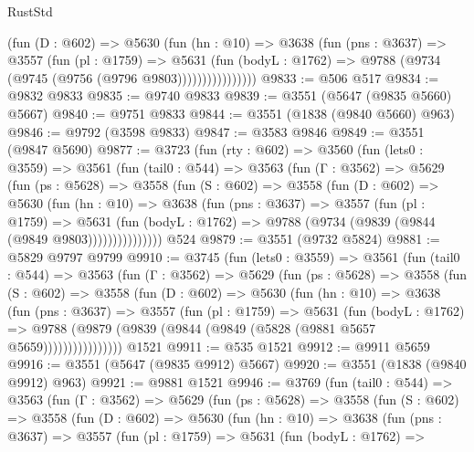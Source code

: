 \begin{lexlean}{RustStd}
\begin{coremodule}
                  (fun (D : @602) =>
                  @5630
                    (fun (hn : @10) =>
                    @3638
                      (fun (pns : @3637) =>
                      @3557
                        (fun (pl : @1759) =>
                        @5631
                          (fun (bodyL : @1762) =>
                          @9788 (@9734 (@9745 (@9756 (@9796 @9803))))))))))))))))
@9833 := @506 @517
@9834 := @9832 @9833
@9835 := @9740 @9833
@9839 := @3551 (@5647 (@9835 @5660) @5667)
@9840 := @9751 @9833
@9844 := @3551 (@1838 (@9840 @5660) @963)
@9846 := @9792 (@3598 @9833)
@9847 := @3583 @9846
@9849 := @3551 (@9847 @5690)
@9877 := @3723
    (fun (rty : @602) =>
    @3560
      (fun (lets0 : @3559) =>
      @3561
        (fun (tail0 : @544) =>
        @3563
          (fun (Γ : @3562) =>
          @5629
            (fun (ps : @5628) =>
            @3558
              (fun (S : @602) =>
              @3558
                (fun (D : @602) =>
                @5630
                  (fun (hn : @10) =>
                  @3638
                    (fun (pns : @3637) =>
                    @3557
                      (fun (pl : @1759) =>
                      @5631
                        (fun (bodyL : @1762) =>
                        @9788 (@9734 (@9839 (@9844 (@9849 @9803)))))))))))))))
    @524
@9879 := @3551 (@9732 @5824)
@9881 := @5829 @9797 @9799
@9910 := @3745
    (fun (lets0 : @3559) =>
    @3561
      (fun (tail0 : @544) =>
      @3563
        (fun (Γ : @3562) =>
        @5629
          (fun (ps : @5628) =>
          @3558
            (fun (S : @602) =>
            @3558
              (fun (D : @602) =>
              @5630
                (fun (hn : @10) =>
                @3638
                  (fun (pns : @3637) =>
                  @3557
                    (fun (pl : @1759) =>
                    @5631
                      (fun (bodyL : @1762) =>
                      @9788 (@9879 (@9839 (@9844 (@9849 (@5828 (@9881 @5657 @5659))))))))))))))))
    @1521
@9911 := @535 @1521
@9912 := @9911 @5659
@9916 := @3551 (@5647 (@9835 @9912) @5667)
@9920 := @3551 (@1838 (@9840 @9912) @963)
@9921 := @9881 @1521
@9946 := @3769
    (fun (tail0 : @544) =>
    @3563
      (fun (Γ : @3562) =>
      @5629
        (fun (ps : @5628) =>
        @3558
          (fun (S : @602) =>
          @3558
            (fun (D : @602) =>
            @5630
              (fun (hn : @10) =>
              @3638
                (fun (pns : @3637) =>
                @3557
                  (fun (pl : @1759) =>
                  @5631
                    (fun (bodyL : @1762) =>

\end{coremodule}
\end{lexlean}
